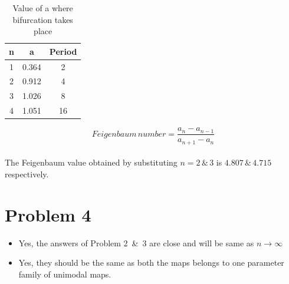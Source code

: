 \documentclass[11pt,a4paper]{article}
\begin{document}
\begin{table}[H]
\caption{Value of a where bifurcation takes place}
\centering\par\medskip
\begin{tabular}{|c|c|c|}
\hline
n & a & Period\\
\hline
1 & 0.364 & 2\\
2 & 0.912 & 4\\
3 & 1.026 & 8\\
4 & 1.051 & 16\\
\hline 
\end{tabular}
\end{table}
$$Feigenbaum\, number = \frac{a_{n} - a_{n-1}}{a_{n+1} - a_{n}}$$
\\
The Feigenbaum value obtained by substituting $n = 2 \,\&\, 3$ is $4.807 \,\&\, 4.715$ respectively.
\section*{Problem 4}
\begin{itemize}
	\item Yes, the answers of Problem 2 \,\&\, 3 are close and will be same as ${n\to\infty}$
	\item Yes, they should be the same as both the maps belongs to one parameter family of unimodal maps.
\end{itemize}
\end{document}
